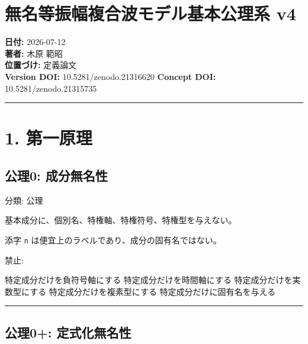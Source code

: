 \documentclass[
  a4paper,
]{ltjsarticle}
\author{}
\date{}
\newenvironment{Shaded}{}{}
\newcommand{\NormalTok}[1]{#1}
\begin{document}
\section{無名等振幅複合波モデル基本公理系
v4}\label{ux7121ux540dux7b49ux632fux5e45ux8907ux5408ux6ce2ux30e2ux30c7ux30ebux57faux672cux516cux7406ux7cfb-v4}

\textbf{日付:} 2026-07-12\\
\textbf{著者:} 木原 範昭\\
\textbf{位置づけ:} 定義論文\\
\textbf{Version DOI:} 10.5281/zenodo.21316620 \textbf{Concept DOI:}
10.5281/zenodo.21315735

\begin{center}\rule{0.5\linewidth}{0.5pt}\end{center}

\section{1. 第一原理}\label{ux7b2cux4e00ux539fux7406}

\subsection{公理0:
成分無名性}\label{ux516cux74060-ux6210ux5206ux7121ux540dux6027}

分類: 公理

基本成分に、個別名、特権軸、特権符号、特権型を与えない。

添字 \texttt{n} は便宜上のラベルであり、成分の固有名ではない。

禁止:

\begin{Shaded}
\begin{Highlighting}[]
\NormalTok{特定成分だけを負符号軸にする}
\NormalTok{特定成分だけを時間軸にする}
\NormalTok{特定成分だけを実数型にする}
\NormalTok{特定成分だけを複素型にする}
\NormalTok{特定成分だけに固有名を与える}
\end{Highlighting}
\end{Shaded}

\begin{center}\rule{0.5\linewidth}{0.5pt}\end{center}

\subsection{公理0+:
定式化無名性}\label{ux516cux74060-ux5b9aux5f0fux5316ux7121ux540dux6027}
\end{document}
